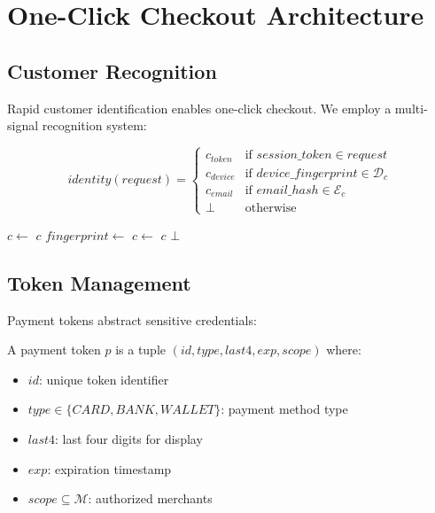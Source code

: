 \section{One-Click Checkout Architecture}


\subsection{Customer Recognition}

Rapid customer identification enables one-click checkout. We employ a multi-signal recognition system:

\begin{equation}
identity(request) = \begin{cases}
    c_{token} & \text{if } session\_token \in request \\
    c_{device} & \text{if } device\_fingerprint \in \mathcal{D}_c \\
    c_{email} & \text{if } email\_hash \in \mathcal{E}_c \\
    \bot & \text{otherwise}
\end{cases}
\end{equation}

\begin{algorithm}
\caption{Customer Recognition}
\begin{algorithmic}[1]
        \State $c \gets$ 
         \Return $c$ \EndIf
    \EndIf
    \State $fingerprint \gets$ 
    \State $c \gets$ 
        \State \Return $c$
    \EndIf
        \State \Return {}
    \EndIf
    \State \Return $\bot$
\EndFunction
\end{algorithmic}
\end{algorithm}

\subsection{Token Management}

Payment tokens abstract sensitive credentials:

\begin{definition}
A payment token $p$ is a tuple $(id, type, last4, exp, scope)$ where:
\begin{itemize}
    \item $id$: unique token identifier
    \item $type \in \{CARD, BANK, WALLET\}$: payment method type
    \item $last4$: last four digits for display
    \item $exp$: expiration timestamp
    \item $scope \subseteq \mathcal{M}$: authorized merchants
\end{itemize}
\end{definition}


